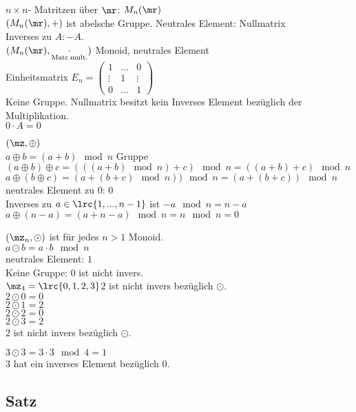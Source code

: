 		\item $n\times n$- Matritzen über $\mr$: $M_n(\mr)$\\
		$(M_n(\mr),+)$ ist abelsche Gruppe. Neutrales Element: Nullmatrix\\
		Inverses zu $A:-A$.\\
		$(M_n(\mr),\underset{\mbox{\scriptsize Matr.mult.}}{\cdot})$ Monoid, neutrales Element\\
		Einheitsmatrix $E_n=\begin{pmatrix}1&\dots&0\\\vdots&1&\vdots\\0&\dots&1
		\end{pmatrix}$\\
		Keine Gruppe. Nullmatrix besitzt kein Inverses Element bezüglich der Multiplikation.\\
		$0\cdot A=0$
		\item $(\mz,\oplus)$\\
		$a\oplus b=(a+b)\mod n$ Gruppe\\
		$(a\oplus b)\oplus c=(((a+b)\mod n)+c)\mod n=((a+b)+c)\mod n$\\
		$a\oplus(b\oplus c)=(a+(b+c)\mod n))\mod n=(a+(b+c))\mod n$\\
		neutrales Element zu $0$: $0$\\
		Inverses zu $a\in\lrc{1,...,n-1}$ ist $-a\mod n=n-a$\\
		$a\oplus(n-a)=(a+n-a)\mod n=n\mod n=0$
		\item $(\mz_n,\odot)$ ist für jedes $n>1$ Monoid.\\
		$a\odot b=a\cdot b\mod n$\\
		neutrales Element: $1$\\
		Keine Gruppe: $0$ ist nicht invers.\\
		$\mz_4=\lrc{0,1,2,3}$\quad $2$ ist nicht invers bezüglich $\odot$.\\
		$2\odot 0=0$\\
		$2\odot 1=2$\\
		$2\odot 2=0$\\
		$2\odot 3=2$\\
		$2$ ist nicht invers bezüglich $\odot$.
		
		$3\odot 3=3\cdot 3\mod 4=1$\\
		$3$ hat ein inverses Element bezüglich $0$.
	\subExEnd
	
	\subsection{Satz}
	
